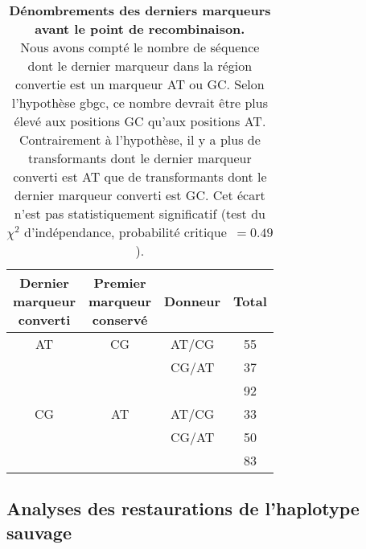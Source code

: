 \begin{table}[htbp]
  \centering
  \rmfamily
  \begin{tabular}{cccc}
    \toprule
    \thead{Dernier\\marqueur\\converti} & \thead{Premier\\marqueur\\conservé} & Donneur & Total                    \\
    \midrule
    AT                        & CG                        & AT/CG   & 55                       \\
                              &                           & CG/AT   & 37                       \\
                              &                           &         & \cellcolor{LightGray} 92 \\
    \midrule[0.1pt]
    CG                        & AT                        & AT/CG   & 33                       \\
                              &                           & CG/AT   & 50                       \\
                              &                           &         & \cellcolor{LightGray} 83 \\
    \bottomrule
  \end{tabular}
  \caption[Dénombrements des derniers marqueurs avant le point de
  recombinaison]{\textbf{Dénombrements des derniers marqueurs avant le point de
      recombinaison.} \\
    \rmfamily Nous avons compté le nombre de séquence dont le dernier marqueur
    dans la région convertie est un marqueur AT ou GC. Selon l'hypothèse
    \ac{gbgc}, ce nombre devrait être plus élevé aux positions GC qu'aux
    positions AT. Contrairement à l'hypothèse, il y a plus de transformants dont
    le dernier marqueur converti est AT que de transformants dont le dernier
    marqueur converti est GC. Cet écart n'est pas statistiquement significatif
    (test du \(\chi^2\) d'indépendance, probabilité critique~\(=0.49\)).
  }
  \label{tab:doublets}
\end{table}

\subsection{Analyses des restaurations de l'haplotype sauvage}
\label{subsec:restaur}

